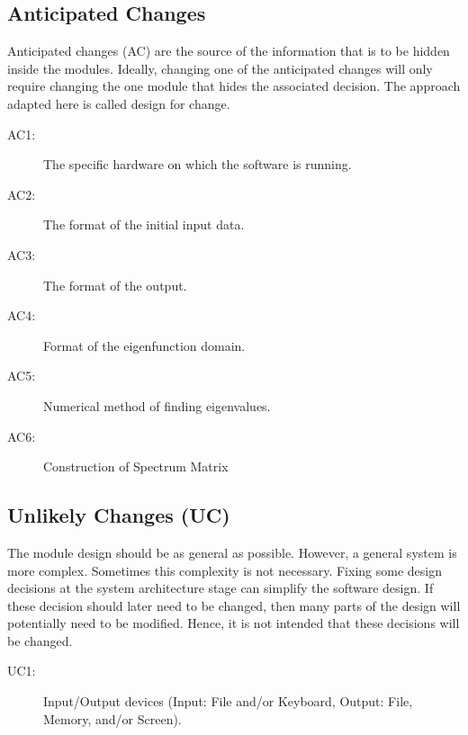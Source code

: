\documentclass[12pt, titlepage]{article}
\begin{document}
\subsection{Anticipated Changes} \label{SecAchange}

Anticipated changes (AC) are the source of the information that is to be hidden
inside the modules. Ideally, changing one of the anticipated changes will only
require changing the one module that hides the associated decision. The approach
adapted here is called design for
change.

\begin{description}
\item[AC1:] The specific hardware on which the software is running.\\
\item[AC2:] The format of the initial input data.\\
\item[AC3:] The format of the output.\\
\item[AC4:] Format of the eigenfunction domain. \\
\item[AC5:] Numerical method of finding eigenvalues. \\ 
\item[AC6:] Construction of Spectrum Matrix \\ 
\end{description}

\subsection{Unlikely Changes (UC)} \label{SecUchange}

The module design should be as general as possible. However, a general system is
more complex. Sometimes this complexity is not necessary. Fixing some design
decisions at the system architecture stage can simplify the software design. If
these decision should later need to be changed, then many parts of the design
will potentially need to be modified. Hence, it is not intended that these
decisions will be changed.

\begin{description}
\item[UC1:] Input/Output devices
  (Input: File and/or Keyboard, Output: File, Memory, and/or Screen).\\

\end{description}
\end{document}
